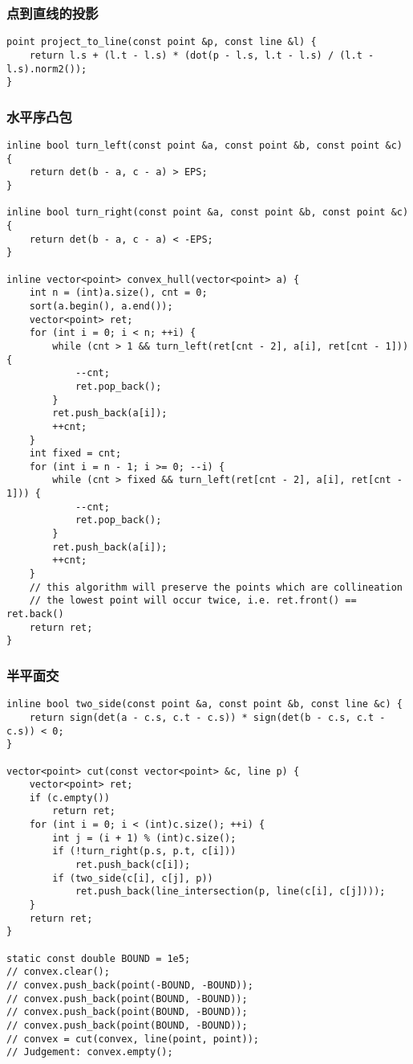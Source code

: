 \documentclass{article}
\begin{document}
\subsubsection{点到直线的投影}

\begin{lstlisting}
point project_to_line(const point &p, const line &l) {
    return l.s + (l.t - l.s) * (dot(p - l.s, l.t - l.s) / (l.t - l.s).norm2());
}
\end{lstlisting}

\subsubsection{水平序凸包}

\begin{lstlisting}
inline bool turn_left(const point &a, const point &b, const point &c) {
    return det(b - a, c - a) > EPS;
}

inline bool turn_right(const point &a, const point &b, const point &c) {
    return det(b - a, c - a) < -EPS;
}

inline vector<point> convex_hull(vector<point> a) {
    int n = (int)a.size(), cnt = 0;
    sort(a.begin(), a.end());
    vector<point> ret;
    for (int i = 0; i < n; ++i) {
        while (cnt > 1 && turn_left(ret[cnt - 2], a[i], ret[cnt - 1])) {
            --cnt;
            ret.pop_back();
        }
        ret.push_back(a[i]);
        ++cnt;
    }
    int fixed = cnt;
    for (int i = n - 1; i >= 0; --i) {
        while (cnt > fixed && turn_left(ret[cnt - 2], a[i], ret[cnt - 1])) {
            --cnt;
            ret.pop_back();
        }
        ret.push_back(a[i]);
        ++cnt;
    }
    // this algorithm will preserve the points which are collineation
    // the lowest point will occur twice, i.e. ret.front() == ret.back()
    return ret;
}
\end{lstlisting}

\subsubsection{半平面交}

\begin{lstlisting}
inline bool two_side(const point &a, const point &b, const line &c) {
    return sign(det(a - c.s, c.t - c.s)) * sign(det(b - c.s, c.t - c.s)) < 0;
}

vector<point> cut(const vector<point> &c, line p) {
    vector<point> ret;
    if (c.empty())
        return ret;
    for (int i = 0; i < (int)c.size(); ++i) {
        int j = (i + 1) % (int)c.size();
        if (!turn_right(p.s, p.t, c[i]))
            ret.push_back(c[i]);
        if (two_side(c[i], c[j], p))
            ret.push_back(line_intersection(p, line(c[i], c[j])));
    }
    return ret;
}

static const double BOUND = 1e5;
// convex.clear();
// convex.push_back(point(-BOUND, -BOUND));
// convex.push_back(point(BOUND, -BOUND));
// convex.push_back(point(BOUND, -BOUND));
// convex.push_back(point(BOUND, -BOUND));
// convex = cut(convex, line(point, point));
// Judgement: convex.empty();
\end{lstlisting}
\end{document}
